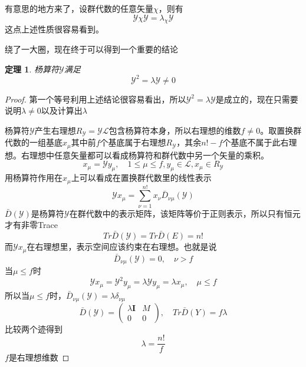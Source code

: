 \documentclass[12pt]{article}
\newtheorem{theorem}{定理}[subsection]
\newtheorem{proof}{证明}[subsection]
\begin{document}
有意思的地方来了，设群代数的任意矢量$\chi$，则有
\begin{equation*}
    \mathcal{Y}\chi\mathcal{Y}=\lambda_\chi\mathcal{Y}
\end{equation*}
这点上述性质很容易看到。

绕了一大圈，现在终于可以得到一个重要的结论
\begin{theorem}
    杨算符$\mathcal{Y}$满足
    \begin{equation*}
        \mathcal{Y}^2=\lambda \mathcal{Y}\neq0
    \end{equation*}
\end{theorem}
\begin{proof}
    第一个等号利用上述结论很容易看出，所以$\mathcal{Y}^2=\lambda\mathcal{Y}$是成立的，现在只需要说明$\lambda\neq0$以及计算出$\lambda$

    杨算符$\mathcal{Y}$产生右理想$R_\mathcal{Y}=\mathcal{Y}\mathcal{L}$包含杨算符本身，所以右理想的维数$f\neq0$。取置换群代数的一组基底$x_\mu$其中前$f$个基底属于右理想$R_{\mathcal{Y}}$，其余$n!-f$个基底不属于此右理想。右理想中任意矢量都可以看成杨算符和群代数中另一个矢量的乘积。
    \begin{equation*}
        x_\mu=\mathcal{Y}y_\mu,\quad1\leq\mu\leq f,y_\mu\in\mathcal{L},x_\mu\in R_\mathcal{Y}
    \end{equation*}
    用杨算符作用在$x_\mu$上可以看成在置换群代数里的线性表示
    \begin{equation*}
        \mathcal{Y}x_\mu=\sum_{\nu=1}^{n!}x_\nu \bar{D}_{\nu\mu}(\mathcal{Y})
    \end{equation*}
    $\bar{D}(\mathcal{Y})$是杨算符$\mathcal{Y}$在群代数中的表示矩阵，该矩阵等价于正则表示，所以只有恒元才有非零Trace
    \begin{equation*}
        Tr\bar{D}(\mathcal{Y})=Tr\bar{D}(E)=n!
    \end{equation*}
    而$\mathcal{Y}x_\mu$在右理想里，表示空间应该约束在右理想。也就是说
    \begin{equation*}
        \bar{D}_{\nu\mu}(\mathcal{Y})=0,\quad\nu>f
    \end{equation*}
    当$\mu\leq f$时
    \begin{equation*}
        \mathcal{Y}x_\mu=\mathcal{Y}^2y_\mu=\lambda\mathcal{Y}y_\mu=\lambda x_\mu,\quad\mu\leq f
    \end{equation*}
    所以当$\mu\leq f$时，$\bar{D}_{\nu\mu}(\mathcal{Y})=\lambda\delta_{\nu\mu}$
    \begin{equation*}
        \bar{D}(\mathcal{Y})=\begin{pmatrix}
            \lambda\mathbf{I}&M\\
            0&0
        \end{pmatrix},\quad Tr\bar{D}(Y)=f\lambda
    \end{equation*}
    比较两个迹得到
    \begin{equation*}
        \lambda=\frac{n!}{f}
    \end{equation*}
    $f$是右理想维数
\end{proof}
\end{document}

